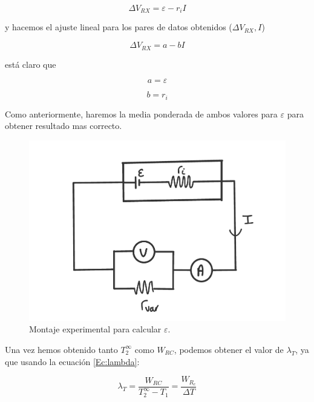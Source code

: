 \documentclass[12pt,a4paper]{article}
\begin{document}
\begin{equation}
\Delta V_{RX} = \varepsilon - r_i I
\end{equation}

y hacemos el ajuste lineal para los pares de datos obtenidos ($\Delta V_{RX}, I$)

\begin{equation}
\Delta V_{RX} = a - b I
\end{equation}

está claro que 

\begin{equation}
a = \varepsilon
\end{equation}

\begin{equation}
b = r_i
\end{equation}

Como anteriormente, haremos la media ponderada de ambos valores para $\varepsilon$ para obtener resultado mas correcto.

\begin{figure}[h!] \centering
\includegraphics[scale=0.2]{montaje.png}
\caption{Montaje experimental para calcular $\varepsilon$. }
\label{Fig:montaje1}
\end{figure}


Una vez hemos obtenido tanto $T_2^{\infty}$ como $W_{RC}$, podemos obtener el valor de $\lambda_T$, ya que usando la ecuación \ref{Ec:lambda}:

\begin{equation}
\lambda_T = \dfrac{W_{RC}}{T_2^{\infty}-T_1} = \dfrac{W_{R_c}}{\Delta T}
\end{equation}
\end{document}
